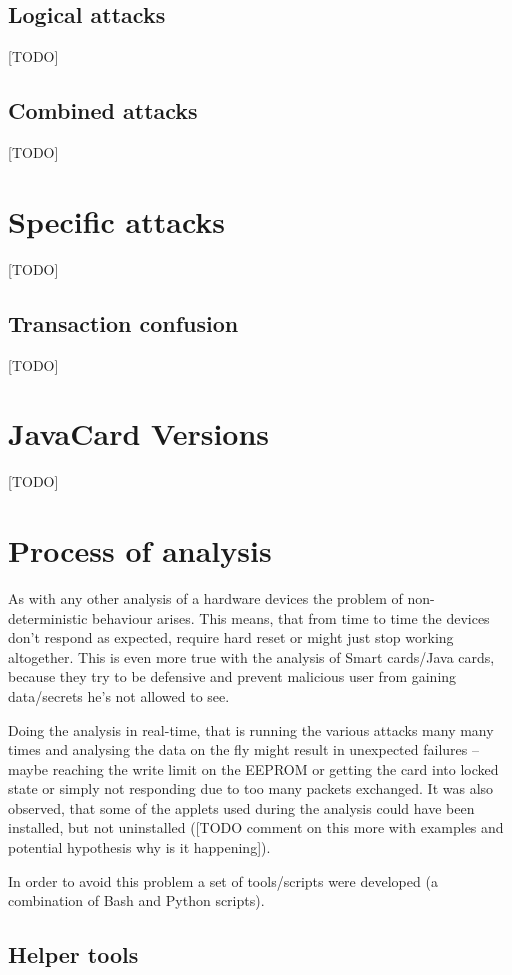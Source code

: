 \documentclass[a4paper]{scrartcl}
\begin{document}
\subsection{Logical attacks}
[TODO]
\subsection{Combined attacks}
[TODO]

\section{Specific attacks}
[TODO]

\subsection{Transaction confusion}
[TODO]


\section{JavaCard Versions}
[TODO]

\section{Process of analysis}

As with any other analysis of a hardware devices the problem of non-deterministic behaviour arises. This means, that from time to time the devices don't respond as expected, require hard reset or might just stop working altogether. This is even more true with the analysis of Smart cards/Java cards, because they try to be defensive and prevent malicious user from gaining data/secrets he's not allowed to see.

Doing the analysis in real-time, that is running the various attacks many many times and analysing the data on the fly might result in unexpected failures -- maybe reaching the write limit on the EEPROM or getting the card into locked state or simply not responding due to too many packets exchanged. It was also observed, that some of the applets used during the analysis could have been installed, but not uninstalled ([TODO comment on this more with examples and potential hypothesis why is it happening]).

In order to avoid this problem a set of tools/scripts were developed (a combination of Bash and Python scripts).

\subsection{Helper tools}
\end{document}
